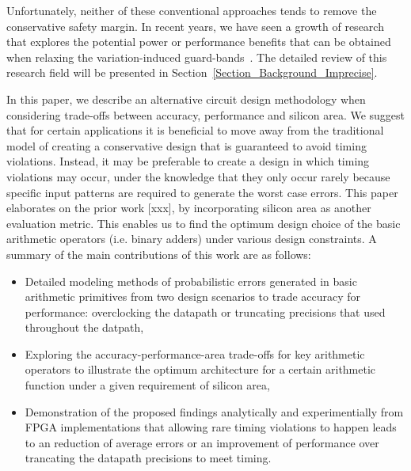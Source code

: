 \documentclass[prodmode,acmtrets]{acmsmall} %
\begin{document}
Unfortunately, neither of these conventional approaches tends to remove the conservative safety margin. In recent years, we have seen a growth of research that explores the potential power or performance benefits that can be obtained when relaxing the variation-induced guard-bands~\cite{NewBox2004}. The detailed review of this research field will be presented in Section~\ref{Section_Background_Imprecise}.

In this paper, we describe an alternative circuit design methodology when considering trade-offs between accuracy, performance and silicon area. We suggest that for certain applications it is beneficial to move away from the traditional model of creating a conservative design that is guaranteed to avoid timing violations. Instead, it may be preferable to create a design in which timing violations may occur, under the knowledge that they only occur rarely because specific input patterns are required to generate the worst case errors. This paper elaborates on the prior work [xxx], by incorporating silicon area as another evaluation metric. This enables us to find the optimum design choice of the basic arithmetic operators (i.e. binary adders) under various design constraints. A summary of the main contributions of this work are as follows:

\begin{itemize}
	\item Detailed modeling methods of probabilistic errors generated in basic arithmetic primitives from two design scenarios to trade accuracy for performance: overclocking the datapath or truncating precisions that used throughout the datpath,
	\item Exploring the accuracy-performance-area trade-offs for key arithmetic operators to illustrate the optimum architecture for a certain arithmetic function under a given requirement of silicon area,
	\item Demonstration of the proposed findings analytically and experimentially from FPGA implementations that allowing rare timing violations to happen leads to an reduction of average errors or an improvement of performance over trancating the datapath precisions to meet timing.
\end{itemize}
\end{document}
